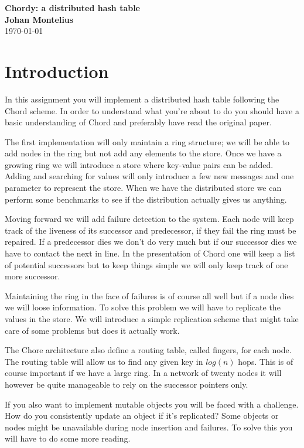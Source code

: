 \documentclass[a4paper,11pt]{article}
\newcommand{\nnsection}[1]{
\section*{#1}
\addcontentsline{toc}{section}{#1}
}
\begin{document}
\begin{center}
\vspace{20pt}{}
\textbf{\large Chordy: a distributed hash table}\\
\vspace{10pt}
\textbf{Johan Montelius}\\
\vspace{10pt}
\today{}
\end{center}

\nnsection{Introduction}

In this assignment you will implement a distributed hash table
following the Chord scheme. In order to understand what you're about
to do you should have a basic understanding of Chord and preferably
have read the original paper. 

The first implementation will only maintain a ring structure; we will
be able to add nodes in the ring but not add any elements to the
store. Once we have a growing ring we will introduce a store where
key-value pairs can be added. Adding and searching for values will
only introduce a few new messages and one parameter to represent the
store. When we have the distributed store we can perform some
benchmarks to see if the distribution actually gives us anything.

Moving forward we will add failure detection to the system. Each node
will keep track of the liveness of its successor and predecessor, if
they fail the ring must be repaired. If a predecessor dies we don't do
very much but if our successor dies we have to contact the next in
line. In the presentation of Chord one will keep a list of potential
successors but to keep things simple we will only keep track of one
more successor.

Maintaining the ring in the face of failures is of course all well but
if a node dies we will loose information. To solve this problem we
will have to replicate the values in the store. We will introduce a
simple replication scheme that might take care of some problems but
does it actually work.

The Chore architecture also define a routing table, called fingers,
for each node. The routing table will allow us to find any given key in
$log(n)$ hops. This is of course important if we have a large ring. In
a network of twenty nodes it will however be quite manageable to
rely on the successor pointers only.

If you also want to implement mutable objects you will be faced with a
challenge. How do you consistently update an object if it's
replicated? Some objects or nodes might be unavailable during node
insertion and failures. To solve this you will have
to do some more reading.
\end{document}
